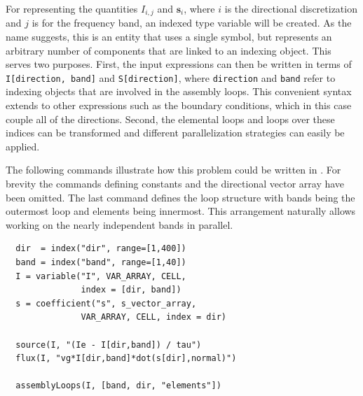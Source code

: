 \documentclass[twoside,leqno,twocolumn]{article}
\begin{document}
For representing the quantities $I_{i,j}$ and $\textbf{s}_{i}$, where $i$ is the directional discretization and $j$ is for the frequency band, an indexed type variable will be created. As the name suggests, this is an entity that uses a single symbol, but represents an arbitrary number of components that are linked to an indexing object. This serves two purposes. First, the input expressions can then be written in terms of \texttt{I[direction, band]} and \texttt{S[direction]}, where \texttt{direction} and \texttt{band} refer to indexing objects that are involved in the assembly loops. This convenient syntax extends to other expressions such as the boundary conditions, which in this case couple all of the directions. Second, the elemental loops and loops over these indices can be transformed and different parallelization strategies can easily be applied.

The following commands illustrate how this problem could be written in \FMshop. For brevity the commands defining constants and the directional vector array have been omitted. The last command defines the loop structure with bands being the outermost loop and elements being innermost. This arrangement naturally allows working on the nearly independent bands in parallel.
\begin{verbatim}
  dir  = index("dir", range=[1,400])
  band = index("band", range=[1,40])
  I = variable("I", VAR_ARRAY, CELL, 
               index = [dir, band])
  s = coefficient("s", s_vector_array, 
               VAR_ARRAY, CELL, index = dir)

  source(I, "(Ie - I[dir,band]) / tau")
  flux(I, "vg*I[dir,band]*dot(s[dir],normal)")

  assemblyLoops(I, [band, dir, "elements"])
\end{verbatim}
\end{document}

